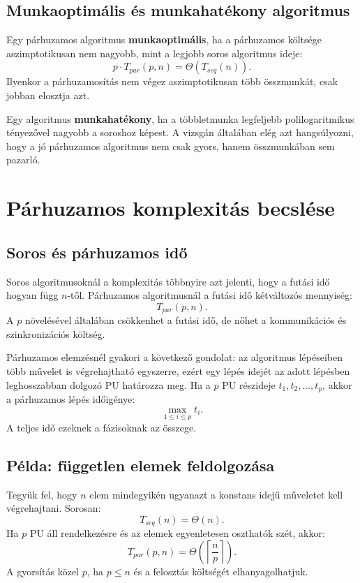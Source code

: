 \subsection{Munkaoptimális és munkahatékony algoritmus}

Egy párhuzamos algoritmus \textbf{munkaoptimális}, ha a párhuzamos költsége aszimptotikusan nem nagyobb, mint a legjobb soros algoritmus ideje:
\[
  p\cdot T_{par}(p,n)=\Theta(T_{seq}(n)).
\]
Ilyenkor a párhuzamosítás nem végez aszimptotikusan több összmunkát, csak jobban elosztja azt.

Egy algoritmus \textbf{munkahatékony}, ha a többletmunka legfeljebb polilogaritmikus tényezővel nagyobb a soroshoz képest. A vizsgán általában elég azt hangsúlyozni, hogy a jó párhuzamos algoritmus nem csak gyors, hanem összmunkában sem pazarló.

\section{Párhuzamos komplexitás becslése}

\subsection{Soros és párhuzamos idő}

Soros algoritmusoknál a komplexitás többnyire azt jelenti, hogy a futási idő hogyan függ $n$-től. Párhuzamos algoritmusnál a futási idő kétváltozós mennyiség:
\[
  T_{par}(p,n).
\]
A $p$ növelésével általában csökkenhet a futási idő, de nőhet a kommunikációs és szinkronizációs költség.

Párhuzamos elemzésnél gyakori a következő gondolat: az algoritmus lépéseiben több művelet is végrehajtható egyszerre, ezért egy lépés idejét az adott lépésben leghosszabban dolgozó PU határozza meg. Ha a $p$ PU részideje $t_1,t_2,\dots,t_p$, akkor a párhuzamos lépés időigénye:
\[
  \max_{1\leq i\leq p} t_i.
\]
A teljes idő ezeknek a fázisoknak az összege.

\subsection{Példa: független elemek feldolgozása}

Tegyük fel, hogy $n$ elem mindegyikén ugyanazt a konstans idejű műveletet kell végrehajtani. Sorosan:
\[
  T_{seq}(n)=\Theta(n).
\]
Ha $p$ PU áll rendelkezésre és az elemek egyenletesen oszthatók szét, akkor:
\[
  T_{par}(p,n)=\Theta\left(\left\lceil\frac{n}{p}\right\rceil\right).
\]
A gyorsítás közel $p$, ha $p\leq n$ és a felosztás költségét elhanyagolhatjuk.

